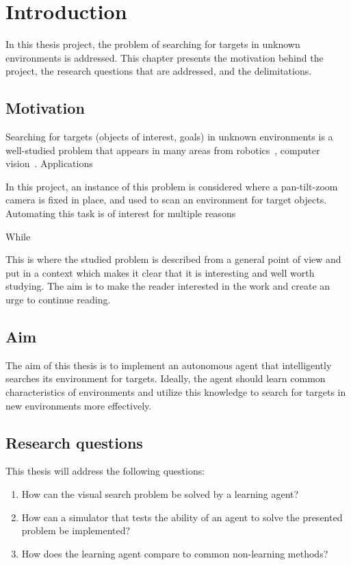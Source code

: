 \chapter{Introduction}
\label{cha:introduction}

In this thesis project, the problem of searching for targets in unknown environments is addressed. This chapter presents the motivation behind the project, the research questions that are addressed, and the delimitations. 

\section{Motivation}
\label{sec:motivation}

Searching for targets (objects of interest, goals) in unknown environments is a well-studied problem that appears in many areas from robotics~\cite{}, computer vision~\cite{}. Applications 

In this project, an instance of this problem is considered where a pan-tilt-zoom camera is fixed in place, and used to scan an environment for target objects. Automating this task is of interest for multiple reasons


While 

This is where the studied problem is described from a general
point of view and put in a context which makes it clear that
it is interesting and well worth studying. The aim is to make
the reader interested in the work and create an urge to
continue reading.

\section{Aim}
\label{sec:aim}

The aim of this thesis is to implement an autonomous agent that intelligently searches its environment for targets. Ideally, the agent should learn common characteristics of environments and utilize this knowledge to search for targets in new environments more effectively.

\section{Research questions}
\label{sec:research-questions}

This thesis will address the following questions:

\begin{enumerate}
  \item How can the visual search problem be solved by a learning agent?
  \item How can a simulator that tests the ability of an agent to solve  the presented problem be implemented?
  \item How does the learning agent compare to common non-learning methods?
\end{enumerate}

